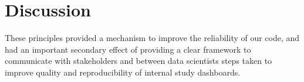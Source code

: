 \documentclass{amia}
\begin{document}
\section*{Discussion}

These principles provided a mechanism to improve the reliability of our code, and had an important secondary effect of providing a clear framework to communicate with stakeholders and between data scientists steps taken to improve quality and reproducibility of internal study dashboards.
\end{document}
